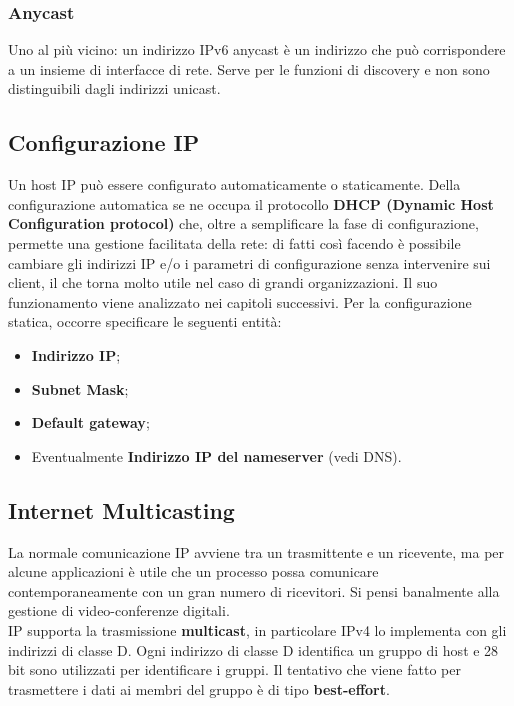 \documentclass{article}
\begin{document}
            \subsubsection*{Anycast}
            Uno al più vicino: un indirizzo IPv6 anycast è un indirizzo che può corrispondere a un insieme
            di interfacce di rete. Serve per le funzioni di discovery e non sono distinguibili dagli indirizzi
            unicast.
            
        \subsection{Configurazione IP}
        Un host IP può essere configurato automaticamente o staticamente. Della configurazione
        automatica se ne occupa il protocollo \textbf{DHCP (Dynamic Host Configuration protocol)} che,
        oltre a semplificare la fase di configurazione, permette una gestione facilitata della rete: di fatti
        così facendo è possibile cambiare gli indirizzi IP e/o i parametri di configurazione senza
        intervenire sui client, il che torna molto utile nel caso di grandi organizzazioni. Il suo
        funzionamento viene analizzato nei capitoli successivi.
        Per la configurazione statica, occorre specificare le seguenti entità:
        \begin{itemize}
            \item \textbf{Indirizzo IP};
            \item \textbf{Subnet Mask};
            \item \textbf{Default gateway};
            \item Eventualmente \textbf{Indirizzo IP del nameserver} (vedi DNS).
        \end{itemize}       

        \subsection{Internet Multicasting}
        La normale comunicazione IP avviene tra un trasmittente e un ricevente, ma per alcune
        applicazioni è utile che un processo possa comunicare contemporaneamente con un gran
        numero di ricevitori. Si pensi banalmente alla gestione di video-conferenze digitali.\\
        
        IP supporta la trasmissione \textbf{multicast}, in particolare IPv4 lo implementa con gli indirizzi di
        classe D. Ogni indirizzo di classe D identifica un gruppo di host e 28 bit sono utilizzati per
        identificare i gruppi. Il tentativo che viene fatto per trasmettere i dati ai membri del gruppo è
        di tipo \textbf{best-effort}.\\
        
\end{document}

